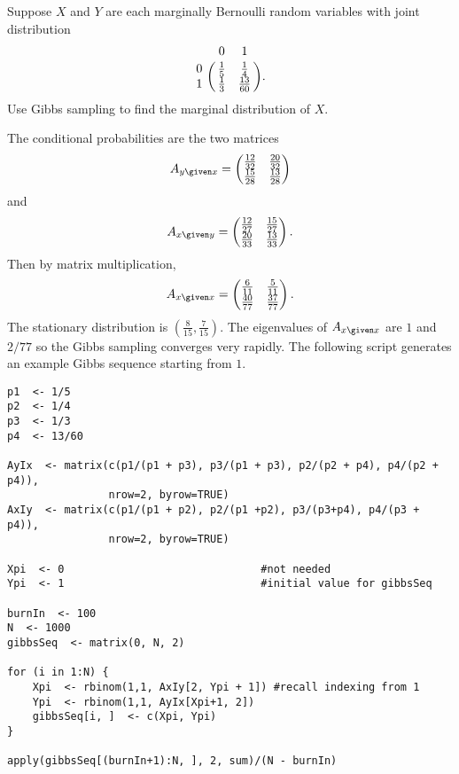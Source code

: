 \documentclass[12pt]{article}
\begin{document}
\renewcommand{\theexerciseseries}{}
\renewcommand{\theexercise}{\arabic{exercise}}

\begin{exercise}
    Suppose \( X \) and \( Y \) are each marginally Bernoulli random
    variables with joint distribution
    \[
        \bordermatrix{
            & 0 & 1 \cr
            0 & \frac{1}{5} & \frac{1}{4} \cr
            1 & \frac{1}{3} & \frac{13}{60} }.
    \] Use Gibbs sampling to find the marginal distribution of \( X \).
\end{exercise}
\begin{solution}
    The conditional probabilities are the two matrices
    \[
        A_{y \given x} =
        \begin{pmatrix}
            \frac{12}{32} & \frac{20}{32} \\
            \frac{15}{28} & \frac{13}{28}
        \end{pmatrix}
    \] and
    \[
        A_{x \given y} =
        \begin{pmatrix}
            \frac{12}{27} & \frac{15}{27} \\
            \frac{20}{33} & \frac{13}{33}
        \end{pmatrix}
        .
    \] Then by matrix multiplication,
    \[
        A_{x \given x} =
        \begin{pmatrix}
            \frac{6}{11} & \frac{5}{11}\\
            \frac{40}{77} & \frac{37}{77}
        \end{pmatrix}
        .
    \] The stationary distribution is \( (\frac{8}{15}, \frac{7}{15}) \).
    The eigenvalues of \( A_{x \given x} \) are \( 1 \) and \( 2/77 \)
    so the Gibbs sampling converges very rapidly.  The following script
    generates an example Gibbs sequence starting from \( 1 \).
\begin{lstlisting}
p1  <- 1/5
p2  <- 1/4
p3  <- 1/3
p4  <- 13/60

AyIx  <- matrix(c(p1/(p1 + p3), p3/(p1 + p3), p2/(p2 + p4), p4/(p2 + p4)),
                nrow=2, byrow=TRUE)
AxIy  <- matrix(c(p1/(p1 + p2), p2/(p1 +p2), p3/(p3+p4), p4/(p3 + p4)),
                nrow=2, byrow=TRUE)

Xpi  <- 0                               #not needed
Ypi  <- 1                               #initial value for gibbsSeq

burnIn  <- 100
N  <- 1000
gibbsSeq  <- matrix(0, N, 2)

for (i in 1:N) {
    Xpi  <- rbinom(1,1, AxIy[2, Ypi + 1]) #recall indexing from 1
    Ypi  <- rbinom(1,1, AyIx[Xpi+1, 2])
    gibbsSeq[i, ]  <- c(Xpi, Ypi)
}

apply(gibbsSeq[(burnIn+1):N, ], 2, sum)/(N - burnIn)
\end{lstlisting}
\end{solution}
\end{document}
